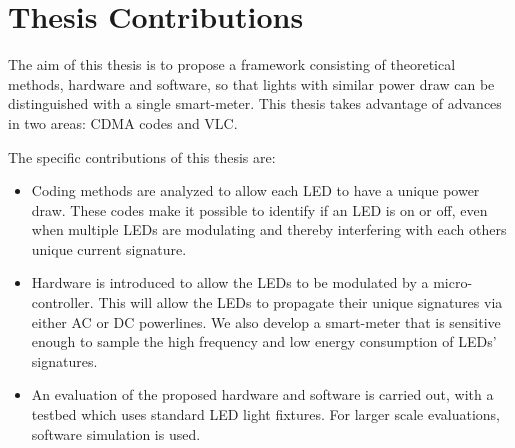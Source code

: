 

\section{Thesis Contributions}

The aim of this thesis is to propose a framework consisting of theoretical methods, hardware and software, so that lights with similar power draw can be distinguished with a single smart-meter.
This thesis takes advantage of advances in two areas: CDMA codes and VLC.

The specific contributions of this thesis are:

\begin{itemize}

	\item Coding methods are analyzed to allow each LED to have a unique power draw. 
	These codes make it possible to identify if an LED is on or off, even when multiple LEDs are modulating and thereby interfering with each others unique current signature.




	\item Hardware is introduced to allow the LEDs to be modulated by a micro-controller. 
	This will allow the LEDs to propagate their unique signatures via either AC or DC powerlines.
	We also develop a smart-meter that is sensitive enough to sample the high frequency and low energy consumption of LEDs’ signatures. 




	\item An evaluation of the proposed hardware and software is carried out, with a testbed which uses standard LED light fixtures. For larger scale evaluations, software simulation is used. 
\end{itemize}
